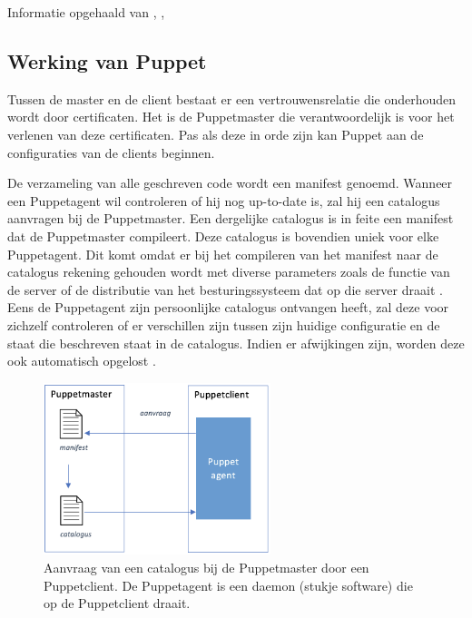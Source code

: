  Informatie opgehaald van \textcite{languagePuppet}, \textcite{masterproef}, \textcite{ansibledoc}



\subsection{Werking van Puppet}

Tussen de master en de client bestaat er een vertrouwensrelatie die onderhouden wordt door certificaten. Het is de Puppetmaster die verantwoordelijk is voor het verlenen van deze certificaten. Pas als deze in orde zijn kan Puppet  aan de configuraties van de clients beginnen. 

De verzameling van alle geschreven code wordt een manifest genoemd. Wanneer een Puppetagent wil controleren of hij nog up-to-date is, zal hij een catalogus aanvragen bij de Puppetmaster. Een dergelijke catalogus is in feite een manifest dat de Puppetmaster compileert. Deze catalogus is bovendien uniek voor elke Puppetagent. Dit komt omdat er bij het compileren van het manifest naar de catalogus rekening gehouden wordt met diverse parameters zoals de functie van de server of de distributie van het besturingssysteem dat op die server draait \autocite{Puppetlanguagecatalog}. Eens de Puppetagent zijn persoonlijke catalogus ontvangen heeft, zal deze voor zichzelf controleren of er verschillen zijn tussen zijn huidige configuratie en de staat die beschreven staat in de catalogus. Indien er afwijkingen zijn, worden deze ook automatisch opgelost \autocite{puppetdoc}.

\begin{figure}  \begin{center}
  \includegraphics[width=250px]{img/aanvraagCatalogus.png}
 \end{center}\caption{Aanvraag van een catalogus bij de Puppetmaster door een Puppetclient. De Puppetagent is een daemon (stukje software) die op de Puppetclient draait.}  
  \label{fig:aanvraagCatalogus}
\end{figure}


